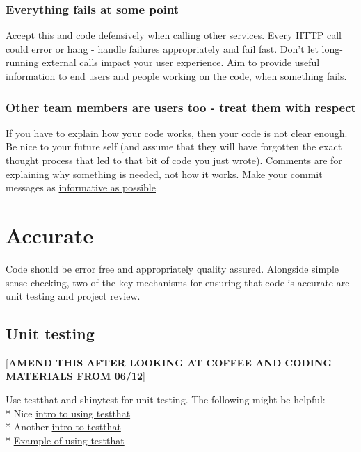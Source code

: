 \documentclass[]{book}
\begin{document}
\hypertarget{errors}{%
\subsubsection{Everything fails at some point}\label{errors}}

Accept this and code defensively when calling other services.
Every HTTP call could error or hang - handle failures appropriately and fail fast. Don't let long-running external calls impact your user experience.
Aim to provide useful information to end users and people working on the code, when something fails.

\hypertarget{users}{%
\subsubsection{Other team members are users too - treat them with respect}\label{users}}

If you have to explain how your code works, then your code is not clear enough.
Be nice to your future self (and assume that they will have forgotten the exact thought process that led to that bit of code you just wrote).
Comments are for explaining why something is needed, not how it works.
Make your commit messages as \href{https://robots.thoughtbot.com/5-useful-tips-for-a-better-commit-message}{informative as possible}

\hypertarget{accurate}{%
\section{Accurate}\label{accurate}}

Code should be error free and appropriately quality assured. Alongside simple sense-checking, two of the key mechanisms for ensuring that code is accurate are unit testing and project review.

\hypertarget{unittest}{%
\subsection{Unit testing}\label{unittest}}

{[}\textbf{AMEND THIS AFTER LOOKING AT COFFEE AND CODING MATERIALS FROM 06/12}{]}

Use testthat and shinytest for unit testing. The following might be helpful:\\
* Nice \href{https://katherinemwood.github.io/post/testthat/}{intro to using testthat}\\
* Another \href{https://towardsdatascience.com/unit-testing-in-r-68ab9cc8d211}{intro to testthat}\\
* \href{https://github.com/RobinL/costmodelr/tree/master/tests}{Example of using testthat}
\end{document}
